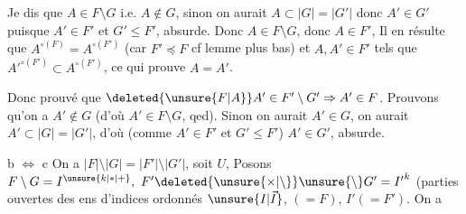 Je dis que $A\in F\setminus G$ i.e. $A\notin G$, sinon on aurait $A\subset|G|=|G'|$ donc $A'\in G'$ puisque $A'\in F'$ et $G'\leq F'$, absurde.  Donc $A\in F\setminus G$, donc $A\in F'$,  Il en résulte que $A^{\circ(F)}=A^{\circ(F')}$ (car $F'\preceq F$\deleted{)} cf lemme plus bas) et \uline{}  $A,A'\in F'$ tels que ${A'}^{\circ(F')}\subset A^{\circ(F')}$, ce qui prouve $A=A'$.

Donc  prouvé que $\deleted{\unsure{F|A}}A'\in F'\setminus G'\Rightarrow A'\in F$. Prouvons qu'on a $A'\notin G$ (d'où $A'\in F\setminus G$\deleted{)}, qed). Sinon on aurait $A'\in G$, on aurait $A'\subset |G|=|G'|$, d'où
(comme $A'\in F'$ et $G'\leq F'$) $A'\in G'$, absurde.


b $\Longleftrightarrow$ c  On a $|F|\setminus|G|=|F'|\setminus|G'|$, soit $U$, Posons $F\setminus G=I^{\unsure{k|\ast|+}},\ F'\deleted{\unsure{\times|\setminus}}\unsure{\setminus}G'={I'}^{k}$ (parties ouvertes des ens d'indices ordonnés $\unsure{I|\vec I}$,  $(=F)$, $I'(=F')$. On a
